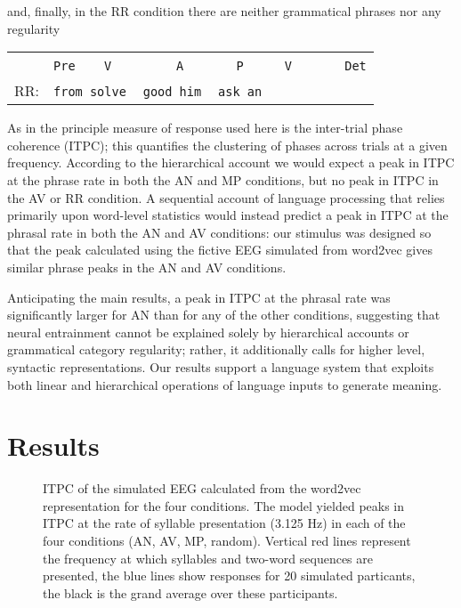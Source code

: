 \documentclass[11pt,a4wide]{article}
\newcommand{\tts}{%
  \texttt{\,}
}
\begin{document}
and, finally, in the RR condition there are neither grammatical phrases nor any regularity
\begin{center}
  \begin{tabular}{cl}
   &\texttt{Pre}\tts{}\tts{}\texttt{V}\tts\tts\tts{}\tts{}\tts{}\texttt{A}\tts{}\tts\tts{}\tts{}\texttt{P}\tts{}\tts{}\tts{}\texttt{V}\tts\tts\tts\tts{}\texttt{Det}\\ 
RR:&\texttt{from solve}\tts\texttt{good him}{}\tts\texttt{ask an}
\end{tabular}
\end{center}

As in \cite{DingEtAl2017} the principle measure of response used here
is the inter-trial phase coherence (ITPC); this quantifies the
clustering of phases across trials at a given frequency. According to
the hierarchical account we would expect a peak in ITPC at the phrase
rate in both the AN and MP conditions, but no peak in ITPC in the AV
or RR condition. A sequential account of language processing that
relies primarily upon word-level statistics would instead predict a
peak in ITPC at the phrasal rate in both the AN and AV conditions: our
stimulus was designed so that the peak calculated using the
fictive EEG simulated from word2vec gives similar phrase peaks in the
AN and AV conditions.

Anticipating the main results, a peak in ITPC at the phrasal rate was
significantly larger for AN than for any of the other conditions,
suggesting that neural entrainment cannot be explained solely by
hierarchical accounts or grammatical category regularity; rather, it
additionally calls for higher level, syntactic representations. Our
results support a language system that exploits both linear and
hierarchical operations of language inputs to generate meaning.

\section*{Results}

\begin{figure}[tbhp]

\caption{ITPC of the simulated EEG calculated from the word2vec
  representation for the four conditions. The model yielded peaks in
  ITPC at the rate of syllable presentation (3.125 Hz) in each of the
  four conditions (AN, AV, MP, random). Vertical red lines represent
  the frequency at which syllables and two-word sequences are
  presented, the blue lines show responses for 20 simulated
  particants, the black is the grand average over these participants.
}
\label{fig:Fig1}
\end{figure}
\end{document}
